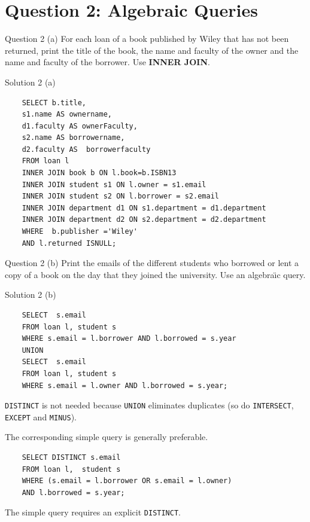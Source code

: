 \section*{Question 2: Algebraic Queries}

\begin{frame}[fragile]{Question 2 (a)}
For each loan of a book published by Wiley that has not been returned, print the title of the book, the name and faculty of the owner and the name and faculty of the borrower. Use \textbf{INNER JOIN}.
\end{frame}

\begin{frame}[fragile]{Solution 2 (a)}
\begin{lstlisting}
	SELECT b.title, 
	s1.name AS ownername, 
	d1.faculty AS ownerFaculty, 
	s2.name AS borrowername, 
	d2.faculty AS  borrowerfaculty
	FROM loan l 
	INNER JOIN book b ON l.book=b.ISBN13
	INNER JOIN student s1 ON l.owner = s1.email
	INNER JOIN student s2 ON l.borrower = s2.email
	INNER JOIN department d1 ON s1.department = d1.department
	INNER JOIN department d2 ON s2.department = d2.department
	WHERE  b.publisher ='Wiley'
	AND l.returned ISNULL;
\end{lstlisting} 
\end{frame}

\begin{frame}[fragile]{Question 2 (b)}
Print the emails of the different students who borrowed or lent a copy of a book on the day that they joined the university. Use an algebra\"{\i}c query.
\end{frame}

\begin{frame}[fragile]{Solution 2 (b)}

\begin{lstlisting}
	SELECT  s.email 
	FROM loan l, student s 
	WHERE s.email = l.borrower AND l.borrowed = s.year
	UNION
	SELECT  s.email 
	FROM loan l, student s 
	WHERE s.email = l.owner AND l.borrowed = s.year;
\end{lstlisting}


\texttt{DISTINCT} is not needed because \texttt{UNION}  eliminates duplicates (so do \texttt{INTERSECT}, \texttt{EXCEPT} and \texttt{MINUS}). 

The corresponding simple query is generally preferable.

\begin{lstlisting}
	SELECT DISTINCT s.email 
	FROM loan l,  student s 
	WHERE (s.email = l.borrower OR s.email = l.owner) 
	AND l.borrowed = s.year;
\end{lstlisting}

The simple query requires an explicit \texttt{DISTINCT}.	
\end{frame}

